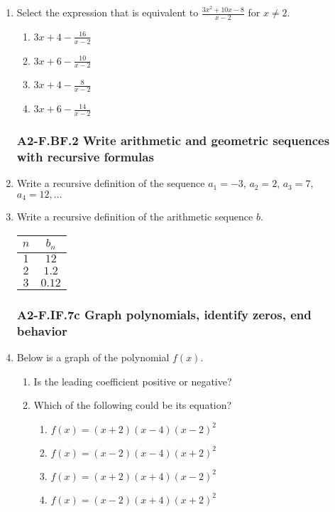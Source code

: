 \documentclass[12pt, twoside]{article}
\begin{document}
\begin{enumerate}[itemsep=0.5cm]
\item Select the expression that is equivalent to $\displaystyle \frac{3x^2 + 10x - 8}{x - 2}$ for $x \neq 2$.
    \begin{enumerate}
        \item $\displaystyle 3x + 4 - \frac{16}{x - 2}$
        \item $\displaystyle 3x + 6 - \frac{10}{x - 2}$
        \item $\displaystyle 3x + 4 - \frac{8}{x - 2}$
        \item $\displaystyle 3x + 6 - \frac{14}{x - 2}$
    \end{enumerate}
    \vspace{3cm}
\newpage
 
\subsubsection*{A2-F.BF.2 Write arithmetic and geometric sequences with recursive formulas}
\item Write a recursive definition of the sequence $a_1 = -3$, $a_2 = 2$, $a_3 = 7$, $a_4 = 12, \ldots$ \vspace{2cm}

\item Write a recursive definition of the arithmetic sequence $b$. \\[0.5cm]
\renewcommand{\arraystretch}{1.5}
\begin{tabular}{|c|c|}
\hline
$n$ & $b_n$ \\
\hline
$1$ & $12$ \\
$2$ & $1.2$ \\
$3$ & $0.12$ \\
\hline
\end{tabular} \vspace{1cm}

\newpage 
\subsubsection*{A2-F.IF.7c Graph polynomials, identify zeros, end behavior}
\item Below is a graph of the polynomial $f(x)$. 
\begin{multicols}{2}
    \begin{enumerate}[itemsep=1cm]
        \item Is the leading coefficient positive or negative?
        \item Which of the following could be its equation?
    \begin{enumerate}
        \item $f(x)=(x+2)(x-4)(x-2)^2$
        \item $f(x)=(x-2)(x-4)(x+2)^2$
        \item $f(x)=(x+2)(x+4)(x-2)^2$
        \item $f(x)=(x-2)(x+4)(x+2)^2$
    \end{enumerate} \vspace{1cm} \;
    \end{enumerate}


\end{multicols}
\end{enumerate}
\end{document}
